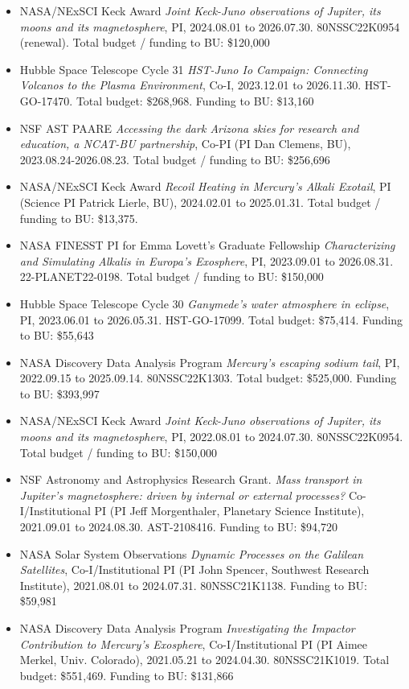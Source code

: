 \documentclass[12pt]{report}
\begin{document}
\begin{itemize} \itemsep -2pt %
 \item NASA/NExSCI Keck Award {\it Joint Keck-Juno observations of Jupiter, its moons and its magnetosphere}, PI, 2024.08.01 to 2026.07.30. 80NSSC22K0954 (renewal). Total budget / funding to BU: \$120,000
 \item Hubble Space Telescope Cycle 31 {\it HST-Juno Io Campaign: Connecting Volcanos to the Plasma Environment}, Co-I, 2023.12.01 to 2026.11.30. HST-GO-17470. Total budget: \$268,968. Funding to BU: \$13,160
 \item NSF AST PAARE {\it Accessing the dark Arizona skies for research and education, a NCAT-BU partnership}, Co-PI (PI Dan Clemens, BU), 2023.08.24-2026.08.23. Total budget / funding to BU: \$256,696
 \item NASA/NExSCI Keck Award {\it Recoil Heating in Mercury's Alkali Exotail}, PI (Science PI Patrick Lierle, BU), 2024.02.01 to 2025.01.31. Total budget / funding to BU: \$13,375.
 \item NASA FINESST PI for Emma Lovett's Graduate Fellowship {\it Characterizing and Simulating Alkalis in Europa’s Exosphere}, PI, 2023.09.01 to 2026.08.31. 22-PLANET22-0198. Total budget / funding to BU: \$150,000
 \item Hubble Space Telescope Cycle 30 {\it Ganymede's water atmosphere in eclipse}, PI, 2023.06.01 to 2026.05.31. HST-GO-17099. Total budget: \$75,414. Funding to BU: \$55,643
 \item NASA Discovery Data Analysis Program {\it Mercury's escaping sodium tail}, PI, 2022.09.15 to 2025.09.14. 80NSSC22K1303. Total budget: \$525,000. Funding to BU: \$393,997
 \item NASA/NExSCI Keck Award {\it Joint Keck-Juno observations of Jupiter, its moons and its magnetosphere}, PI, 2022.08.01 to 2024.07.30. 80NSSC22K0954. Total budget / funding to BU: \$150,000
 \item NSF Astronomy and Astrophysics Research Grant. {\it Mass transport in Jupiter's magnetosphere: driven by internal or external processes?} Co-I/Institutional PI (PI Jeff Morgenthaler, Planetary Science Institute), 2021.09.01 to 2024.08.30. AST-2108416. Funding to BU: \$94,720
 \item NASA Solar System Observations {\it Dynamic Processes on the Galilean Satellites}, Co-I/Institutional PI (PI John Spencer, Southwest Research Institute), 2021.08.01 to 2024.07.31. 80NSSC21K1138. Funding to BU: \$59,981
 \item NASA Discovery Data Analysis Program {\it Investigating the Impactor Contribution to Mercury's Exosphere}, Co-I/Institutional PI (PI Aimee Merkel, Univ. Colorado), 2021.05.21 to 2024.04.30. 80NSSC21K1019. Total budget: \$551,469. Funding to BU: \$131,866

\end{itemize}
\end{document}
